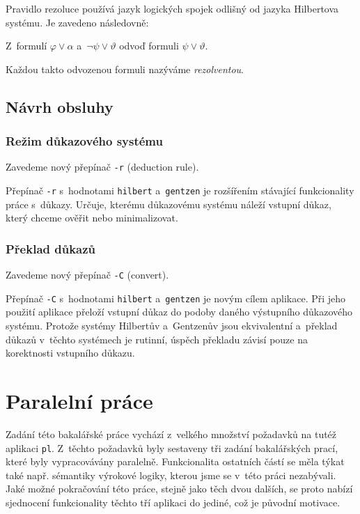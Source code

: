 \documentclass[thesis=B,czech,hidelinks]{thesis}[2012/06/26]
\begin{document}
Pravidlo rezoluce používá jazyk logických spojek odlišný od jazyka Hilbertova systému. Je zavedeno následovně\cite{stary}:

\begin{dfn}
Z~formulí $\varphi \vee \alpha$ a~$\neg \psi \vee \vartheta$ odvoď formuli $\psi \vee \vartheta$.
\end{dfn}

Každou takto odvozenou formuli nazýváme \emph{rezolventou}.

\subsection{Návrh obsluhy}

\subsubsection{Režim důkazového systému}

Zavedeme nový přepínač \texttt{-r} (deduction rule).

Přepínač \texttt{-r} s~hodnotami \texttt{hilbert} a~\texttt{gentzen} je rozšířením stávající funkcionality práce s~důkazy. Určuje, kterému důkazovému systému náleží vstupní důkaz, který chceme ověřit nebo minimalizovat.

\subsubsection{Překlad důkazů}

Zavedeme nový přepínač \texttt{-C} (convert).

Přepínač \texttt{-C} s~hodnotami \texttt{hilbert} a~\texttt{gentzen} je novým cílem aplikace. Při jeho použití aplikace přeloží vstupní důkaz do podoby daného výstupního důkazového systému. Protože systémy Hilbertův a~Gentzenův jsou ekvivalentní\cite{stary} a~překlad důkazů v~těchto systémech je rutinní\cite{sochor}, úspěch překladu závisí pouze na korektnosti vstupního důkazu.

\section{Paralelní práce}

Zadání této bakalářské práce vychází z~velkého množství požadavků na tutéž aplikaci \texttt{pl}. Z~těchto požadavků byly sestaveny tři zadání bakalářských prací, které byly vypracovávány paralelně. Funkcionalita ostatních částí se měla týkat také např. sémantiky výrokové logiky, kterou jsme se v~této práci nezabývali. Jaké možné pokračování této práce, stejně jako těch dvou dalších, se proto nabízí sjednocení funkcionality těchto tří aplikaci do jediné, což je původní motivace.
\end{document}
